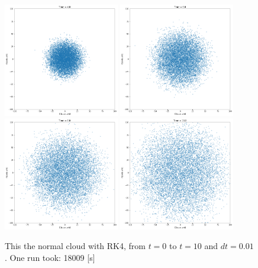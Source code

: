 \documentclass[12pt]{article}
\begin{document}
  \begin{figure}[H]
    \centering 
    \includegraphics[width = 0.45\textwidth]{./RK4/RK4_4.png} 
    \includegraphics[width = 0.45\textwidth]{./RK4/RK4_6.png}
    \includegraphics[width = 0.45\textwidth]{./RK4/RK4_8.png}
    \includegraphics[width = 0.45\textwidth]{./RK4/RK4_10.png} 
    \caption{This the normal cloud with RK4, from $t=0$ to $t=10$ and $dt=0.01$. One run took: 18009 [s]}
    \label{RK4_cloud}
  \end{figure}
\end{document}
